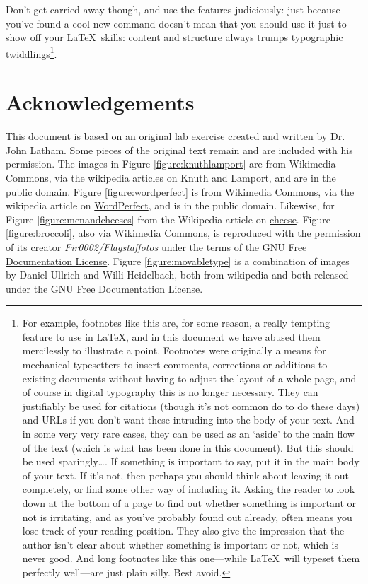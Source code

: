 \begin{refsection}
Don't get carried away though, and use the features judiciously: just because you've found a cool new command doesn't mean that you should use it just to show off your \LaTeX\ skills: content and structure always trumps typographic twiddlings\footnote{For example, footnotes like this are, for some reason, a really tempting feature to use in \LaTeX, and in this document we have abused them mercilessly to illustrate a point. Footnotes were originally a means for mechanical typesetters to insert comments, corrections or additions to existing documents without having to adjust the layout of a whole page, and of course in digital typography this is no longer necessary. They can justifiably be used for citations (though it's not common do to do these days) and URLs if you don't want these intruding into the body of your text. And in some very very rare cases, they can be used as an `aside' to the main flow of the text (which is what has been done in this document). But this should be used sparingly\ldots. If something is important to say, put it in the main body of your text. If it's not, then perhaps you should think about leaving it out completely, or find some other way of including it. Asking the reader to look down at the bottom of a page to find out whether something is important or not is irritating, and as you've probably found out already, often means you lose track of your reading position. They also give the impression that the author isn't clear about whether something is important or not, which is never good. And long footnotes like this one---while \LaTeX\ will typeset them perfectly well---are just plain silly. Best avoid.}.

\section{Acknowledgements}

This document is based on an original lab exercise created and written by Dr. John Latham. Some pieces of the original text remain and are included with his permission.  The images in Figure \ref{figure:knuthlamport} are from Wikimedia Commons, via the wikipedia articles on Knuth and Lamport, and are in the public domain. Figure \ref{figure:wordperfect} is from Wikimedia Commons, via the wikipedia article on \href{http://en.wikipedia.org/wiki/WordPerfect}{WordPerfect}, and is in the public domain. Likewise, for Figure \ref{figure:menandcheeses} from the Wikipedia article on \href{http://en.wikipedia.org/wiki/Cheese}{cheese}. Figure \ref{figure:broccoli}, also via Wikimedia Commons, is reproduced with the permission of its creator \href{http://commons.wikimedia.org/wiki/User:Fir0002}{\emph{Fir0002/Flagstaffotos}} under the terms of the \href{http://commons.wikimedia.org/wiki/Commons:GNU_Free_Documentation_License_1.2}{GNU Free Documentation License}. Figure \ref{figure:movabletype} is a combination of images by Daniel Ullrich and Willi Heidelbach, both from wikipedia and both released under the GNU Free Documentation License.

\printbibliography[heading=subbibliography]
\end{refsection}
\endinput

